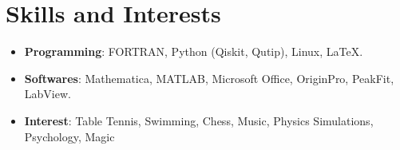 \documentclass[letterpaper,11pt]{article}
\newcommand{\resumeItem}[2]{
  \item\small{
    \textbf{#1}{: #2 \vspace{-2pt}}
  }
}
\newcommand{\resumeSubItem}[2]{\resumeItem{#1}{#2}\vspace{-4pt}}
\newcommand{\aff}[2]{
  \item\small{
    {#1}{#2 \vspace{-2pt}}
  }
}
\newcommand{\resumeSubHeadingListStart}{\begin{itemize}[leftmargin=*]}
\newcommand{\resumeSubHeadingListEnd}{\end{itemize}}
\newcommand{\resumeItemListStart}{\begin{itemize}}
\newcommand{\resumeItemListEnd}{\end{itemize}\vspace{-5pt}}
\begin{document}
\begin{comment}

\section{\textbf{General Publications}}

\resumeItemListStart
        \aff{Azam, Muhammad Bilal. ``Nayi Hukoomat aur Scienci Shaoor''. HumSub. Published $05$ August $2018$, from \url{http://www.humsub.com.pk/157453/bilal-azam/}}{}
        
        \aff{Azam, Muhammad Bilal. ``An Interview with Dr. Muhammed Sameed (CERN, Switzerland)''. HumSub. Published $05$ April $2018$, from \url{http://en.humsub.com.pk/258/muhammad-bilal-azam/}}{}
        
        \aff{Azam, Muhammad Bilal. ``Sciencii Maidaan me Pakistani Science-daanoun ke Karnaamey''. Dawn News Television. Published $26$ July $2017$, from \url{https://www.dawnnews.tv/news/1061688}}{}

        \aff{Azam, Muhammad Bilal. ``Dr. I. H. Usmani: The Common Heritage of All Mankind''. Technology Times 2015. Web. 15 July 2016.}{}

        \aff{Ahmad, Rehan and Azam, Muhammad Bilal. Physics (Intermediate Part--I,II) Chapter Wise Solution of Punjab Boards. Sahiwal: A Plus, $2016$. Print.}{}
\resumeItemListEnd
\end{comment}


\section{\textbf{Skills and Interests}}

\resumeSubHeadingListStart
    \begin{comment}
    \resumeSubItem{Laboratory}
        {Dimensional Analysis, Notebook Skills, Logger Pro, Mach\textbf{--}Zehnder Interferometer, Fabry\textbf{--}Perot Interferometer, alpha\textbf{--}SE Ellipsometer, Oscilloscope.}
        \end{comment}
    \resumeSubItem{Programming}
        {FORTRAN, Python (Qiskit, Qutip), Linux, {\LaTeX}.}
        
         \resumeSubItem{Softwares}
        {Mathematica, MATLAB, Microsoft Office, OriginPro, PeakFit, LabView.}
        \resumeSubItem{Interest}
        {Table Tennis, Swimming, Chess, Music, Physics Simulations, Psychology, Magic}
\resumeSubHeadingListEnd
\end{document}
